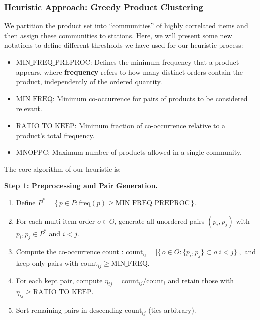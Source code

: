 \documentclass[11pt]{elsarticle}
\begin{document}
\subsubsection{Heuristic Approach: Greedy Product Clustering}

We partition the product set into “communities” of highly correlated items and then assign these communities to stations. Here, we will present some new notations to define different thresholds we have used for our heuristic process: 


\begin{itemize}
    \item \(\mathrm{MIN\_FREQ\_PREPROC}\): Defines the minimum frequency that a product appears, where \textbf{frequency} refers to how many distinct orders contain the product, independently of the ordered quantity.
    \item \(\mathrm{MIN\_FREQ}\): Minimum co-occurrence for pairs of products to be considered relevant.
    \item \(\mathrm{RATIO\_TO\_KEEP}\): Minimum fraction of co-occurrence relative to a product’s total frequency.
    \item \(\mathrm{MNOPPC}\): Maximum number of products allowed in a single community.
\end{itemize}

\noindent The core algorithm of our heuristic is:

\begin{algorithm}[H]
\caption{Algorithm 1: Greedy Product Clustering and Station Assignment (CSLAP)}
\label{alg:greedy-cslap}
\begin{algorithmic}[1]

\Statex \textbf{Step 1: Preprocessing and Pair Generation.}
\begin{enumerate}[label=(\alph*)]
\item Define $P^*=\{\,p\in P:\mathrm{freq}(p)\ge \mathrm{MIN\_FREQ\_PREPROC}\,\}$.
\item For each multi-item order $o\in O$, generate all unordered pairs $(p_i,p_j)$ with $p_i,p_j\in P^*$ and $i<j$.
\item Compute the co-occurrence count : \(\mathrm{count_{ij}} = \big|\{\,o \in O : \{p_i,p_j\} \subset o | i < j \}\big|, \)
and keep only pairs with $\mathrm{count}_{ij}\ge \mathrm{MIN\_FREQ}$.
\item For each kept pair, compute $\eta_{ij}=\mathrm{count}_{ij}/\mathrm{count}_i$ and retain those with $\eta_{ij}\ge \mathrm{RATIO\_TO\_KEEP}$.
\item Sort remaining pairs in descending $\mathrm{count}_{ij}$ (ties arbitrary).
\end{enumerate}
\end{algorithmic}
\end{algorithm}
\end{document}
